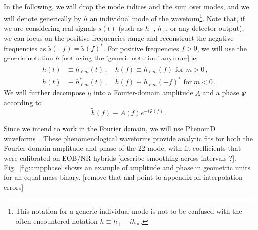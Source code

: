 \documentclass[aps,showpacs,twocolumn,
prd,superscriptaddress,nofootinbib]{revtex4-1}
\newcommand{\be}{\begin{equation}}
\newcommand{\ee}{\end{equation}}
\newcommand{\nn}{\nonumber}
\newcommand{\Hz}{\,\mathrm{Hz}}
\newcommand{\SM}[1]{{\color{Red} #1}}
\begin{document}
In the following, we will drop the mode indices and the sum over modes, and we will denote generically by $h$ an individual mode of the waveform\footnote{This notation for a generic individual mode is not to be confused with the often encountered notation $h\equiv h_{+} - i h_{\times}$.}. Note that, if we are considering real signals $s(t)$ (such as $h_{+}$, $h_{\times}$, or any detector output), we can focus  on the positive-frequencies range and reconstruct the negative frequencies as $\tilde{s}(-f) = \tilde{s}(f)^{*}$. For positive frequencies $f>0$, we will use the generic notation $h$ \SM{[not using the 'generic notation' anymore]} as
\begin{align}\label{eq:notationhsignm}
	h(t) &\equiv h_{\ell m}(t) \,, \quad \tilde{h}(f) \equiv \tilde{h}_{\ell m}(f) \text{ for } m>0 \,, \nn\\
	h(t) &\equiv h_{\ell m}^{*}(t) \,, \quad \tilde{h}(f) \equiv \tilde{h}_{\ell m}(-f)^{*} \text{ for } m<0 \,.
\end{align}
We will further decompose $\tilde{h}$ into a Fourier-domain amplitude $A$ and a phase $\Psi$ according to
\be\label{eq:defAPsi}
	\tilde{h}(f) \equiv A(f) e^{-i\Psi(f)} \,.
\ee

Since we intend to work in the Fourier domain, we will use PhenomD waveforms~\cite{Khan+15}. These phenomenological waveforms provide analytic fits for both the Fourier-domain amplitude and phase of the 22 mode, with fit coefficients that were calibrated on EOB/NR hybrids \SM{[describe smoothing across intervals ?]}. Fig.~\ref{fig:ampphase} shows an example of amplitude and phase in geometric units for an equal-mass binary. \SM{[remove that and point to appendix on interpolation errors]}

\end{document}
